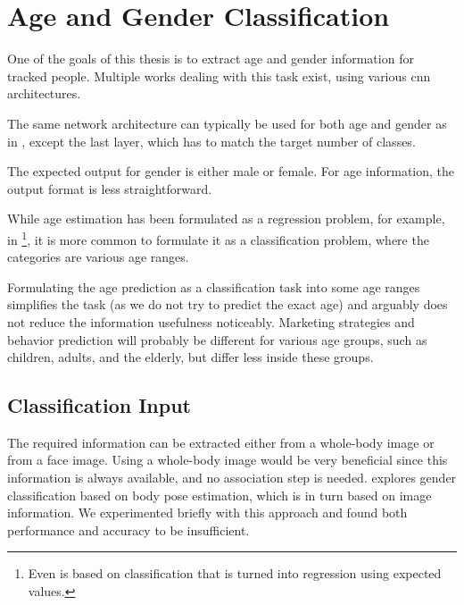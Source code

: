 \section{Age and Gender Classification}

One of the goals of this thesis is to extract age and gender information for tracked people. Multiple works dealing with this task exist, using various \gls{cnn} architectures\cite{levi2015age, yang2018ssr, karkkainenfairface}.

The same network architecture can typically be used for both age and gender as in \cite{levi2015age}, except the last layer, which has to match the target number of classes.

The expected output for gender is either male or female. For age information, the output format is less straightforward.

While age estimation has been formulated as a regression problem, for example, in \cite{yang2018ssr}\footnote{Even \cite{yang2018ssr} is based on classification that is turned into regression using expected values.}, it is more common to formulate it as a classification problem, where the categories are various age ranges\cite{levi2015age, karkkainenfairface}.

Formulating the age prediction as a classification task into some age ranges simplifies the task (as we do not try to predict the exact age) and arguably does not reduce the information usefulness noticeably. Marketing strategies and behavior prediction will probably be different for various age groups, such as children, adults, and the elderly, but differ less inside these groups.

\subsection{Classification Input}

The required information can be extracted either from a whole-body image or from a face image. Using a whole-body image would be very beneficial since this information is always available, and no association step is needed. \cite{pavlakos2019expressiveBody} explores gender classification based on body pose estimation, which is in turn based on image information. We experimented briefly with this approach and found both performance and accuracy to be insufficient.

